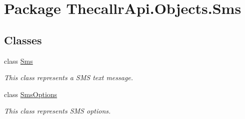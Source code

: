 \hypertarget{namespace_thecallr_api_1_1_objects_1_1_sms}{\section{Package Thecallr\+Api.\+Objects.\+Sms}
\label{namespace_thecallr_api_1_1_objects_1_1_sms}
}
\subsection*{Classes}
\begin{DoxyCompactItemize}
\item 
class \hyperlink{class_thecallr_api_1_1_objects_1_1_sms_1_1_sms}{Sms}
\begin{DoxyCompactList}\small\item\em This class represents a S\+M\+S text message. \end{DoxyCompactList}\item 
class \hyperlink{class_thecallr_api_1_1_objects_1_1_sms_1_1_sms_options}{Sms\+Options}
\begin{DoxyCompactList}\small\item\em This class represents S\+M\+S options. \end{DoxyCompactList}\end{DoxyCompactItemize}
